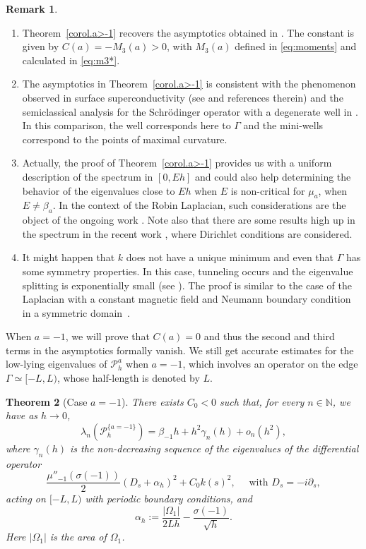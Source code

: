 \documentclass[JEP,XML,SOM,Unicode,NoFloatCountersInSection,published]{cedram}
\newcommand{\cP}{\mathcal{P}}
\theoremstyle{plain}
\newtheorem{theorem}{Theorem}[section]
\theoremstyle{definition}
\newtheorem{remark}[theorem]{Remark}
\newcommand{\N}{\mathbb{N}}
\begin{document}
\skpt
\begin{remark}
\begin{enumerate}
\item Theorem~\ref{corol.a>-1} recovers the asymptotics obtained in \cite{AHK}.
The constant is given by $C(a)= -M_3(a)>0$, with $M_3(a)$ defined in \eqref{eq:moments} and calculated in \eqref{eq:m3*}.
\item The asymptotics in Theorem~\ref{corol.a>-1} is consistent with the phenomenon observed in surface superconductivity (see \cite{FH06} and references therein) and the semiclassical analysis for the Schrödinger operator with a degenerate well in \cite{HeSj5}. In this comparison, the well corresponds here to $\Gamma$ and the mini-wells correspond to the points of maximal curvature.
\item Actually, the proof of Theorem~\ref{corol.a>-1} provides us with a uniform description of the spectrum in $[0,Eh]$ and could also help determining the behavior of the eigenvalues close to $Eh$ when $E$ is non-critical for $\mu_a$, \ie when $E\neq \beta_a$. In the context of the Robin Laplacian, such considerations are the object of the ongoing work \cite{FLTRVN22}. Note also that there are some results
high up in the spectrum in the recent work \cite{GV}, where Dirichlet conditions are considered.
\item It might happen that $k$ does not have a unique minimum and even that $\Gamma$ has some symmetry properties. In this case, tunneling occurs and the eigenvalue splitting is exponentially small (see \cite{FHK22}). The proof is similar to the case of the Laplacian with a constant magnetic field and Neumann boundary condition in a symmetric domain~\cite{BHR22}.
\end{enumerate}
\end{remark}

When $a=-1$, we will prove that $C(a)=0$ and thus the second and third terms in the asymptotics formally vanish. We still get accurate estimates for the low-lying eigenvalues
of $\cP^a_h$ when $a=-1$, which involves an operator on the edge $\Gamma\simeq [-L,L)$, whose half-length is denoted by $L$.

\begin{theorem}[Case $a=-1$]\label{corol.a=-1} There exists $C_0<0$ such that, for every $n\in\N$, we have as $h\to0$,
\[
\lambda_n(\cP_h^{ \{a=-1\}})=
\beta_{-1} h+h^2\gamma_n(h)+o_n(h^2),
\]
where $\gamma_n(h)$ is the non-decreasing sequence of the eigenvalues of the differential operator
\[
\frac{\mu''_{-1}(\sigma(-1))}{2}\left(D_s+\alpha_h\right)^2+C_0k(s)^2,\quad\mbox{ with } D_s=-i\partial_s,
\] 
acting on $[-L,L)$ with periodic boundary conditions, and
\begin{equation}\label{defalphah}
\alpha_h:= \frac{|\Omega_1|}{2Lh} - \frac{\sigma(-1)}{\sqrt{h}}.
\end{equation}
Here $|\Omega_1|$ is the area of $\Omega_1$.
\end{theorem}
\end{document}
